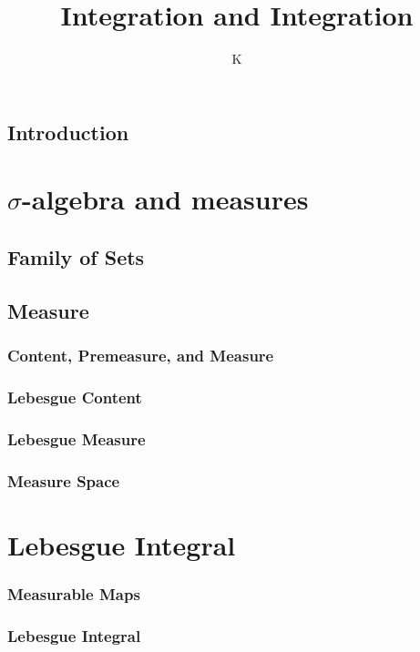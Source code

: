 \documentclass[a4paper]{book}
\title{Integration and Integration}
\author{K}
\theoremstyle{definition}
\begin{document}
\maketitle
\tableofcontents
\chapter*{Introduction}
%
\part{\(\sigma\)-algebra and measures}
%
\chapter{Family of Sets}
%
%
\chapter{Measure}
\section{Content, Premeasure, and Measure}

\section{Lebesgue Content}

\section{Lebesgue Measure}

\section{Measure Space}

%
\part{Lebesgue Integral}
\section{Measurable Maps}
\section{Lebesgue Integral}
%
\end{document}
